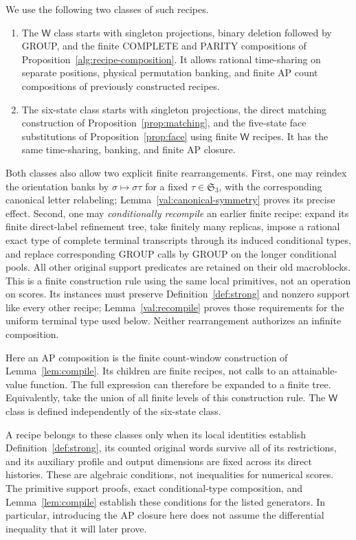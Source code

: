 \documentclass[11pt]{article}
\numberwithin{equation}{section}
\theoremstyle{definition}
\theoremstyle{remark}
\begin{document}
We use the following two classes of such recipes.
\begin{enumerate}[label=\textup{(\alph*)}]
\item The $\mathsf W$ class starts with singleton projections, binary deletion
      followed by GROUP, and the finite COMPLETE and PARITY compositions
      of Proposition~\ref{alg:recipe-composition}.  It allows rational
      time-sharing on separate positions, physical permutation banking,
      and finite AP count compositions of previously constructed recipes.
\item The six-state class starts with singleton projections, the direct
      matching construction of Proposition~\ref{prop:matching}, and the
      five-state face substitutions of Proposition~\ref{prop:face} using
      finite $\mathsf W$ recipes.  It has the same time-sharing, banking, and finite
      AP closure.
\end{enumerate}
Both classes also allow two explicit finite rearrangements.  First, one
may reindex the orientation banks by $\sigma\mapsto\sigma\tau$ for a fixed
$\tau\in\mathfrak S_3$, with the corresponding canonical letter relabeling;
Lemma~\ref{val:canonical-symmetry} proves its precise effect.  Second, one
may \emph{conditionally recompile} an earlier finite recipe: expand its
finite direct-label refinement tree, take finitely many replicas, impose a
rational exact type of complete terminal transcripts through its induced
conditional types, and replace corresponding GROUP calls by GROUP on the
longer conditional pools.  All other original support predicates are retained
on their old macroblocks.  This is a finite construction rule using the same
local primitives, not an operation on scores.  Its instances must preserve
Definition~\ref{def:strong} and nonzero support like every other recipe;
Lemma~\ref{val:recompile} proves those requirements for the uniform terminal
type used below.  Neither rearrangement authorizes an infinite composition.

Here an AP composition is the finite count-window construction of
Lemma~\ref{lem:compile}.  Its children are finite recipes, not calls to an
attainable-value function.  The full expression can therefore be expanded to
a finite tree.  Equivalently, take the union of all finite levels of this
construction rule.  The $\mathsf W$ class is defined independently of the six-state
class.

A recipe belongs to these classes only when its local identities establish
Definition~\ref{def:strong}, its counted original words survive all of its
restrictions, and its auxiliary profile and output dimensions are fixed
across its direct histories.  These are algebraic conditions, not inequalities
for numerical scores.  The primitive support proofs, exact conditional-type
composition, and Lemma~\ref{lem:compile} establish these conditions for the
listed generators.  In particular, introducing the AP closure here does not
assume the differential inequality that it will later prove.
\end{document}
